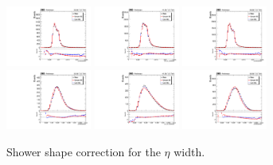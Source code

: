 \begin{figure}[htb]
	\centering
	\includegraphics[width=0.25\textwidth]{fig/ss_corr/phoEtaWidth_16_EB_Z.pdf}
	\includegraphics[width=0.25\textwidth]{fig/ss_corr/ph_sc_etaWidth_17_EB_Z.pdf}
	\includegraphics[width=0.25\textwidth]{fig/ss_corr/phoEtaWidth_18_EB_Z.pdf}\\
	\includegraphics[width=0.25\textwidth]{fig/ss_corr/phoEtaWidth_16_EE_Z.pdf}
	\includegraphics[width=0.25\textwidth]{fig/ss_corr/ph_sc_etaWidth_17_EE_Z.pdf}
	\includegraphics[width=0.25\textwidth]{fig/ss_corr/phoEtaWidth_18_EE_Z.pdf}\\	
	\label{fig:etawidth_Z}
	\caption{Shower shape correction for the $\eta$ width.}
\end{figure}


